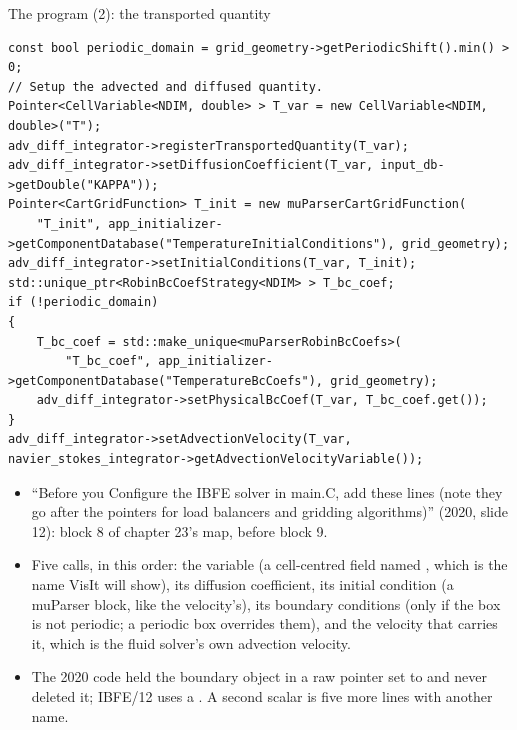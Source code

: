 \documentclass[aspectratio=169,11pt]{beamer}
\begin{document}
\begin{frame}[fragile]{The program (2): the transported quantity}
\label{fr:code2}
\footnotesize
\begin{lstlisting}[style=cpptiny]
const bool periodic_domain = grid_geometry->getPeriodicShift().min() > 0;
// Setup the advected and diffused quantity.
Pointer<CellVariable<NDIM, double> > T_var = new CellVariable<NDIM, double>("T");
adv_diff_integrator->registerTransportedQuantity(T_var);
adv_diff_integrator->setDiffusionCoefficient(T_var, input_db->getDouble("KAPPA"));
Pointer<CartGridFunction> T_init = new muParserCartGridFunction(
    "T_init", app_initializer->getComponentDatabase("TemperatureInitialConditions"), grid_geometry);
adv_diff_integrator->setInitialConditions(T_var, T_init);
std::unique_ptr<RobinBcCoefStrategy<NDIM> > T_bc_coef;
if (!periodic_domain)
{
    T_bc_coef = std::make_unique<muParserRobinBcCoefs>(
        "T_bc_coef", app_initializer->getComponentDatabase("TemperatureBcCoefs"), grid_geometry);
    adv_diff_integrator->setPhysicalBcCoef(T_var, T_bc_coef.get());
}
adv_diff_integrator->setAdvectionVelocity(T_var, navier_stokes_integrator->getAdvectionVelocityVariable());
\end{lstlisting}
\begin{itemize}
  \item ``Before you Configure the IBFE solver in main.C, add these lines (note they go after the pointers for load balancers and gridding algorithms)'' (2020, slide 12): block 8 of chapter 23's map, before block 9.
  \item Five calls, in this order: the variable (a cell-centred field named , which is the name VisIt will show), its diffusion coefficient, its initial condition (a muParser block, like the velocity's), its boundary conditions (only if the box is not periodic; a periodic box overrides them), and the velocity that carries it, which is the fluid solver's own advection velocity.
  \item The 2020 code held the boundary object in a raw pointer set to  and never deleted it; IBFE/12 uses a . A second scalar is five more lines with another name.
\end{itemize}
\end{frame}
\end{document}

